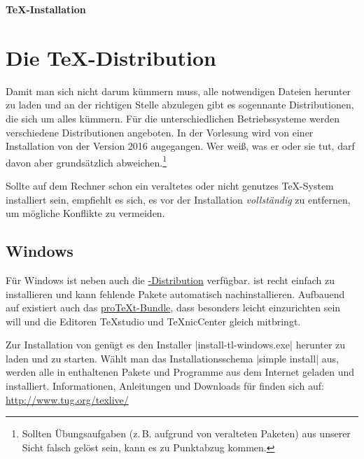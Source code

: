 \documentclass[
	datum=17.10.2016,
]{../tex/latexkurs-exercise}
\begin{document}
\begin{center}
\sffamily\bfseries\Large \TeX-Installation
\end{center}
\begin{abstract}
\noindent
Diese Anleitung erklärt ganz grundlegend, wie man eine aktuelle \TeXlive-\linebreak Distribution Installiert, die für den \LaTeX-Kurs vorausgesetzt wird.
Ein funktionierendes \TeX-System besteht im Grundsatz aus zwei Teilen: einer \TeX-Distribution und einem 
Editor.
\end{abstract}

\section{Die \TeX-Distribution}
Damit man sich nicht darum kümmern muss, alle notwendigen Dateien herunter zu laden und an der richtigen Stelle abzulegen gibt es sogennante Distributionen, die sich um alles kümmern. Für die unterschiedlichen Betriebssysteme werden verschiedene Distributionen angeboten. In der Vorlesung wird von einer Installation von \href{http://www.tug.org/texlive/}{\TeXlive} der Version 2016 augegangen. Wer weiß, was er oder sie tut, darf davon aber grundsätzlich abweichen.\footnote{Sollten Übungsaufgaben (z.\,B. aufgrund von veralteten Paketen) aus unserer Sicht falsch gelöst sein, kann es zu Punktabzug kommen.}

Sollte auf dem Rechner schon ein veraltetes oder nicht genutzes \TeX-System installiert sein, empfiehlt es sich, es vor der Installation \emph{vollständig} zu entfernen, um mögliche Konflikte zu vermeiden.

\subsection*{Windows}
Für Windows ist neben \href{http://www.tug.org/texlive/}{\TeXlive} auch die \href{http://www.miktex.org/}{\MikTeX-Distribution} verfügbar. \MikTeX ist recht einfach zu installieren und kann fehlende Pakete automatisch nachinstallieren. Aufbauend auf \MikTeX existiert auch das \href{http://www.tug.org/protext/}{pro\TeX t-Bundle}, dass besonders leicht einzurichten sein will und die Editoren \TeX studio und \TeX nicCenter gleich mitbringt.

Zur Installation von \TeXlive genügt es den Installer |install-tl-windows.exe| herunter zu laden und zu starten. Wählt man das Installationsschema |simple install| aus, werden alle in \TeXlive enthaltenen Pakete und Programme aus dem Internet geladen und installiert. Informationen, Anleitungen und Downloads für \TeXlive finden sich auf:\\ \url{http://www.tug.org/texlive/}
\end{document}

